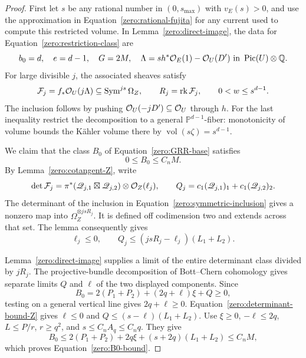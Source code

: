 \begin{proof}
First let \(s\) be any rational number in \((0,s_{\max})\) with
\(v_E(s)>0\), and use the approximation in
Equation~\eqref{zero:rational-fujita} for any current used
to compute this restricted volume.  In
Lemma~\ref{zero:direct-image}, the data for Equation~\eqref{zero:restriction-class}
are
\[
 b_0=d,\quad e=d-1,\quad G=2M,\quad
 \Lambda=s h^*\mathcal O_E(1)-\mathcal O_U(D')
           \ \text{in }\operatorname{Pic}(U)\otimes\mathbb Q.
\]
For large divisible \(j\), the associated sheaves satisfy
\begin{equation}\label{zero:symmetric-inclusion}
 \mathcal F_j=f_*\mathcal O_U(j\Lambda)
       \subseteq\operatorname{Sym}^{js}\Omega_Z,\qquad
 R_j=\operatorname{rk}\mathcal F_j,\qquad 0<w\le s^{d-1}.
\end{equation}
The inclusion follows by pushing
\(\mathcal O_U(-jD')\subseteq\mathcal O_U\) through \(h\).
For the last inequality restrict the decomposition to a general
\(\mathbb{P}^{d-1}\)-fiber: monotonicity of volume bounds the Kähler volume
there by \(\operatorname{vol}(s\zeta)=s^{d-1}\).

We claim that the class \(B_0\) of Equation~\eqref{zero:GRR-base} satisfies
\begin{equation}\label{zero:B0-bound}
 0\le B_0\le C_nM .
\end{equation}
By Lemma~\ref{zero:cotangent-Z}, write
\[
 \det\mathcal F_j
  =\pi^*(\mathscr Q_{j,1}\boxtimes\mathscr Q_{j,2})
       \otimes\mathcal O_Z(\ell_j),\qquad
 Q_j=c_1(\mathscr Q_{j,1})_1+c_1(\mathscr Q_{j,2})_2.
\]
The determinant of the inclusion in
Equation~\eqref{zero:symmetric-inclusion} gives a nonzero map into
\(\Omega_Z^{\otimes jsR_j}\).  It is defined off codimension two and
extends across that set.  The lemma consequently gives
\begin{equation}\label{zero:determinant-bound-Z}
 \ell_j\le0,\qquad Q_j\le(jsR_j-\ell_j)(L_1+L_2).
\end{equation}

Lemma~\ref{zero:direct-image} supplies a limit of the entire determinant
class divided by \(jR_j\).  The projective-bundle decomposition of
Bott--Chern cohomology gives separate limits \(Q\) and \(\ell\) of
the two displayed components.  Since
\[
 B_0=2(P_1+P_2)+(2q+\ell)\xi+Q\ge0,
\]
testing on a general vertical line gives \(2q+\ell\ge0\).
Equation~\eqref{zero:determinant-bound-Z} gives \(\ell\le0\) and
\(Q\le(s-\ell)(L_1+L_2)\).  Use \(\xi\ge0\), \(-\ell\le2q\),
\(L\le P/r\), \(r\ge q^2\), and \(s\le C_nA_q\le C_nq\).
They give
\[
 B_0\le2(P_1+P_2)+2q\xi+(s+2q)(L_1+L_2)
       \le C_nM,
\]
which proves Equation~\eqref{zero:B0-bound}.


\end{proof}
